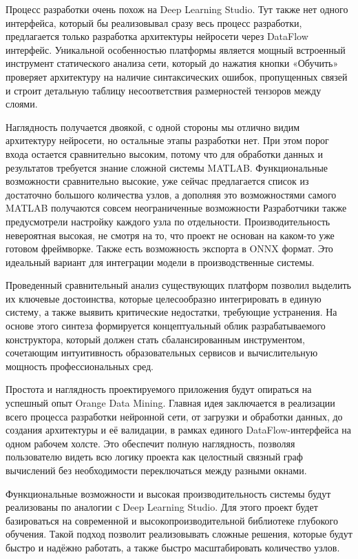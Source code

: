 \documentclass{report}
\begin{document}
Процесс разработки очень похож на Deep Learning Studio. Тут также нет одного интерфейса, который бы реализовывал сразу весь процесс разработки, предлагается только разработка архитектуры нейросети через DataFlow интерфейс. Уникальной особенностью платформы является мощный встроенный инструмент статического анализа сети, который до нажатия кнопки «Обучить» проверяет архитектуру на наличие синтаксических ошибок, пропущенных связей и строит детальную таблицу несоответствия размерностей тензоров между слоями.


Наглядность получается двоякой, с одной стороны мы отлично видим архитектуру нейросети, но остальные этапы разработки нет. При этом порог входа остается сравнительно высоким, потому что для обработки данных и результатов требуется знание сложной системы MATLAB. Функциональные возможности сравнительно высокие, уже сейчас предлагается список из достаточно большого количества узлов, а дополняя это возможностями самого MATLAB получаются совсем неограниченные возможности Разработчики также предусмотрели настройку каждого узла по отдельности. Производительность невероятная высокая, не смотря на то, что проект не основан на каком-то уже готовом фреймворке. Также есть возможность экспорта в ONNX формат. Это идеальный вариант для интеграции модели в производственные системы.

Проведенный сравнительный анализ существующих платформ позволил выделить их ключевые достоинства, которые целесообразно интегрировать в единую систему, а также выявить критические недостатки, требующие устранения. На основе этого синтеза формируется концептуальный облик разрабатываемого конструктора, который должен стать сбалансированным инструментом, сочетающим интуитивность образовательных сервисов и вычислительную мощность профессиональных сред.

Простота и наглядность проектируемого приложения будут опираться на успешный опыт Orange Data Mining. Главная идея заключается в реализации всего процесса разработки нейронной сети, от загрузки и обработки данных, до создания архитектуры и её валидации, в рамках единого DataFlow-интерфейса на одном рабочем холсте. Это обеспечит полную наглядность, позволяя пользователю видеть всю логику проекта как целостный связный граф вычислений без необходимости переключаться между разными окнами.

Функциональные возможности и высокая производительность системы будут реализованы по аналогии с Deep Learning Studio. Для этого проект будет базироваться на современной и высокопроизводительной библиотеке глубокого обучения. Такой подход позволит реализовывать сложные решения, которые будут быстро и надёжно работать, а также быстро масштабировать количество узлов.
\end{document}
